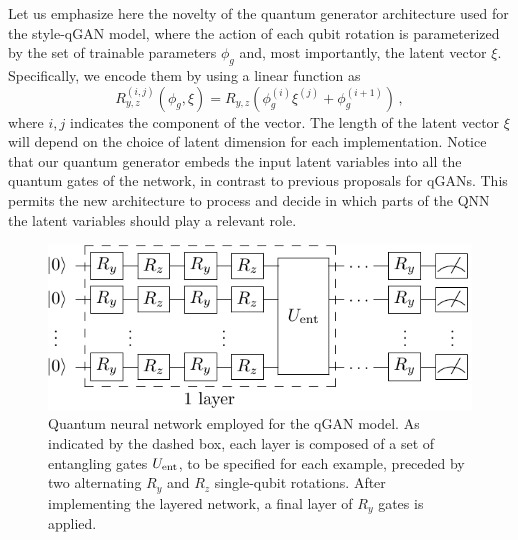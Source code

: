 \documentclass[twocolumn,preprintnumbers,superscriptaddress]{revtex4-2}
\begin{document}
Let us emphasize here the novelty of the quantum generator architecture used for the style-qGAN model, where the action of each qubit rotation is parameterized by the set of trainable parameters $\phi_g$ and, most importantly, the latent vector $\xi$. Specifically, we encode them by using a linear function as
\begin{equation}
    \label{eq:rotation} R_{y,z}^{(i,j)}\left(\phi_g, \xi\right) = R_{y,z}\left(\phi_g^{(i)} \xi^{(j)} + \phi_g^{(i+1)}\right)\,,
\end{equation}
where $i,j$ indicates the component of the vector. The length of the latent vector $\xi$ will depend on the choice of latent dimension for each implementation. Notice that our quantum generator embeds the input latent variables into all the quantum gates of the network, in contrast to previous proposals for qGANs. This permits the new architecture to process and decide in which
parts of the QNN the latent variables should play a relevant role.

\begin{figure}
  \includegraphics[width=1.0\columnwidth]{plots/ansatz1.pdf}
  \caption{\label{fig:circuit}Quantum neural network employed for the qGAN model. As indicated by the dashed box, each layer is composed of a set of entangling gates $U_{\rm ent}$, to be specified for each example, preceded by two alternating $R_y$ and $R_z$ single-qubit rotations. After implementing the layered network, a final layer of $R_y$ gates is applied.}
\end{figure}
\end{document}

